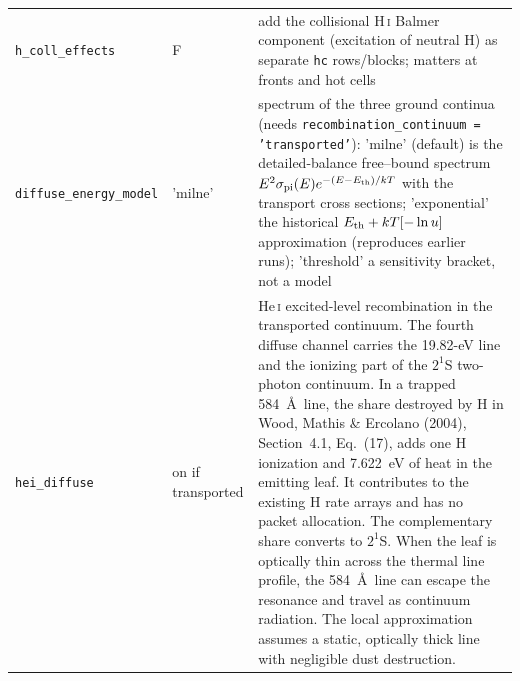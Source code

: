 \documentclass[english,a4paper]{my_memo}
\newcommand{\code}[1]{\texttt{#1}}
\begin{document}
{\begin{longtable}{llp{7.2cm}}
\code{h\_coll\_effects} & F & add the collisional H\,\textsc{i} Balmer component (excitation of neutral H) as separate \code{hc} rows/blocks; matters at fronts and hot cells \\
\code{diffuse\_energy\_model} & 'milne' & spectrum of the three ground continua (needs \code{recombination\_continuum = 'transported'}): 'milne' (default) is the detailed-balance free--bound spectrum $E^2\sigma_{\rm pi}(E)e^{-(E-E_{\rm th})/kT}$ with the transport cross sections; 'exponential' the historical $E_{\rm th}+kT[-\ln u]$ approximation (reproduces earlier runs); 'threshold' a sensitivity bracket, not a model \\
\code{hei\_diffuse} & on if transported &
He\,\textsc{i} excited-level recombination in the transported continuum. The fourth
diffuse channel carries the 19.82-eV line and the ionizing part of the
$2^1$S two-photon continuum. In a trapped 584~\AA\ line, the share destroyed by H
in Wood, Mathis \& Ercolano (2004), Section~4.1, Eq.~(17), adds one H ionization
and 7.622~eV of heat in the emitting leaf. It contributes to the existing H
rate arrays and has no packet allocation. The complementary share converts to
$2^1$S. When the leaf is optically thin across the thermal line profile, the
584~\AA\ line can escape the resonance and travel as continuum radiation.
The local approximation assumes a static, optically thick line with negligible
dust destruction. \\

\end{longtable}}
\end{document}

